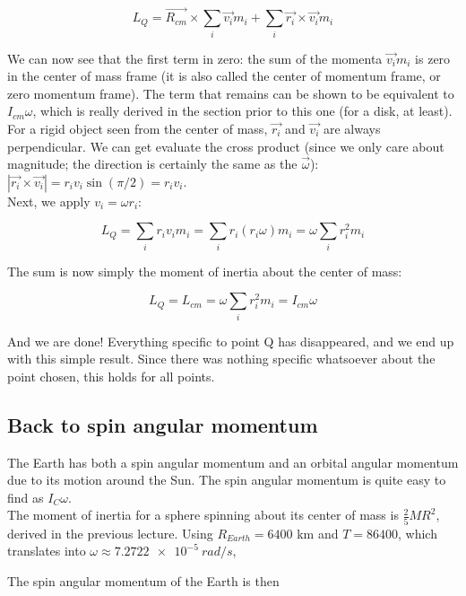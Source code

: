 \begin{equation}
L_Q = \vec{R_{cm}} \times \sum_i \vec{v_i} m_i + \sum_i \vec{r_i} \times \vec{v_i} m_i
\end{equation}

We can now see that the first term in zero: the sum of the momenta $\vec{v_i} m_i$ is zero in the center of mass frame (it is also called the center of momentum frame, or zero momentum frame). The term that remains can be shown to be equivalent to $I_{cm} \omega$, which is really derived in the section prior to this one (for a disk, at least).\\ 
For a rigid object seen from the center of mass, $\vec{r_i}$ and $\vec{v_i}$ are always perpendicular. We can get evaluate the cross product (since we only care about magnitude; the direction is certainly the same as the $\vec{\omega}$): $|\vec{r_i} \times \vec{v_i}| = r_i v_i \sin (\pi/2) = r_i v_i$.\\
Next, we apply $v_i = \omega r_i$:

\begin{equation}
L_Q = \sum_i r_i v_i m_i = \sum_i r_i (r_i \omega) m_i = \omega \sum_i r_i^2 m_i
\end{equation}

The sum is now simply the moment of inertia about the center of mass:

\begin{equation}
L_Q = L_{cm} = \omega \sum_i r_i^2 m_i = I_{cm} \omega
\end{equation}

And we are done! Everything specific to point Q has disappeared, and we end up with this simple result. Since there was nothing specific whatsoever about the point chosen, this holds for all points.

\subsection{Back to spin angular momentum}

The Earth has both a spin angular momentum and an orbital angular momentum due to its motion around the Sun. The spin angular momentum is quite easy to find as $I_C \omega$.\\
The moment of inertia for a sphere spinning about its center of mass is $\displaystyle \frac{2}{5} M R^2$, derived in the previous lecture. Using $R_{Earth} = 6400$ km and $T = 86400$, which translates into $\omega \approx \SI{7.2722e-5}{rad/s}$, 

The spin angular momentum of the Earth is then

